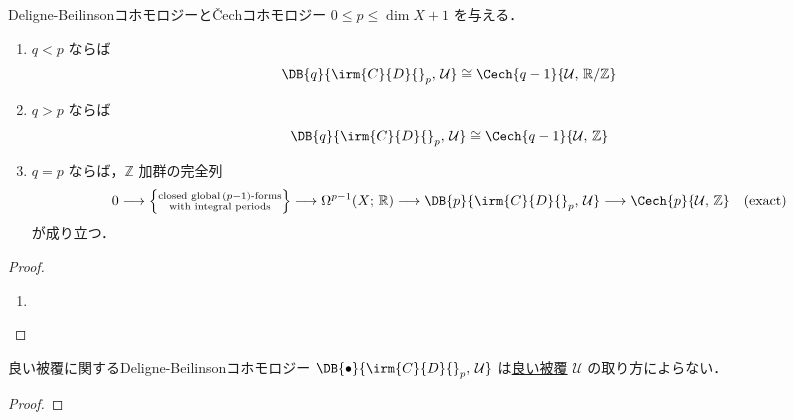 \documentclass[TQFT_main]{subfiles}
\begin{document}
\begin{myprop}[label=prop:Deligne-Beilinson]{Deligne-Beilinsonコホモロジーと\v{C}echコホモロジー}
    $0 \le p \le \dim X + 1$ を与える．
    \begin{enumerate}
        \item $q < p$ ならば
        \begin{align}
            \DB{q}{\irm{C}{D}{}_p,\, \mathcal{U}} \cong \Cech{q-1}{\mathcal{U},\, \mathbb{R}/\mathbb{Z}}
        \end{align}
        \item $q > p$ ならば
        \begin{align}
            \DB{q}{\irm{C}{D}{}_p,\, \mathcal{U}} \cong \Cech{q-1}{\mathcal{U},\, \mathbb{Z}}
        \end{align}
        \item $q=p$ ならば，$\mathbb{Z}$ 加群の完全列
        \begin{align}
            0 \lto \Bigl\{ \substack{\text{closed global}\, (p-1)\text{-forms} \\ \text{with integral periods}} \Bigr\} \lto \Omega^{p-1}(X;\, \mathbb{R}) \lto \DB{p}{\irm{C}{D}{}_p,\, \mathcal{U}} \lto \Cech{p}{\mathcal{U},\, \mathbb{Z}} \quad (\text{exact})
        \end{align}
        が成り立つ．
    \end{enumerate}
\end{myprop}

\begin{proof}
    \begin{enumerate}
        \item 
    \end{enumerate}
\end{proof}

\begin{myprop}[label=prop:DB-good-cover]{良い被覆に関するDeligne-Beilinsonコホモロジー}
    $\DB{\bullet}{\irm{C}{D}{}_p,\, \mathcal{U}}$ は\hyperref[def:good-cover]{良い被覆} $\mathcal{U}$ の取り方によらない．
\end{myprop}

\begin{proof}
    
\end{proof}
\end{document}
